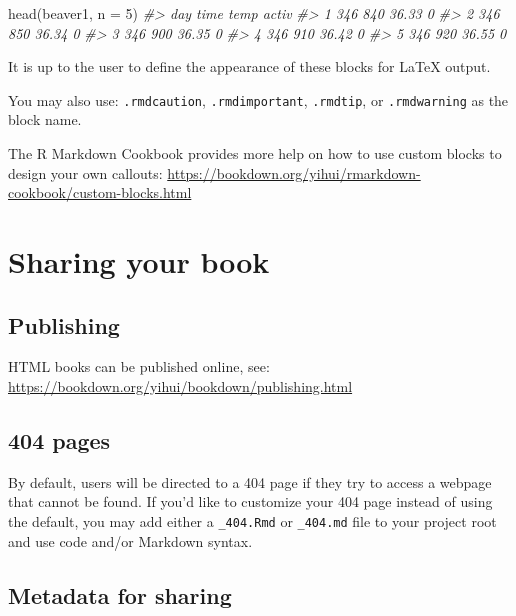 \documentclass[
]{book}
\newenvironment{Shaded}{\begin{snugshade}}{\end{snugshade}}
\newcommand{\AttributeTok}[1]{\textcolor[rgb]{0.77,0.63,0.00}{#1}}
\newcommand{\CommentTok}[1]{\textcolor[rgb]{0.56,0.35,0.01}{\textit{#1}}}
\newcommand{\DecValTok}[1]{\textcolor[rgb]{0.00,0.00,0.81}{#1}}
\newcommand{\FunctionTok}[1]{\textcolor[rgb]{0.00,0.00,0.00}{#1}}
\newcommand{\NormalTok}[1]{#1}
\theoremstyle{definition}
\theoremstyle{definition}
\theoremstyle{definition}
\theoremstyle{definition}
\theoremstyle{remark}
\begin{document}
\begin{Shaded}
\begin{Highlighting}[]
\FunctionTok{head}\NormalTok{(beaver1, }\AttributeTok{n =} \DecValTok{5}\NormalTok{)}
\CommentTok{\#\textgreater{}   day time  temp activ}
\CommentTok{\#\textgreater{} 1 346  840 36.33     0}
\CommentTok{\#\textgreater{} 2 346  850 36.34     0}
\CommentTok{\#\textgreater{} 3 346  900 36.35     0}
\CommentTok{\#\textgreater{} 4 346  910 36.42     0}
\CommentTok{\#\textgreater{} 5 346  920 36.55     0}
\end{Highlighting}
\end{Shaded}

It is up to the user to define the appearance of these blocks for LaTeX output.

You may also use: \texttt{.rmdcaution}, \texttt{.rmdimportant}, \texttt{.rmdtip}, or \texttt{.rmdwarning} as the block name.

The R Markdown Cookbook provides more help on how to use custom blocks to design your own callouts: \url{https://bookdown.org/yihui/rmarkdown-cookbook/custom-blocks.html}

\hypertarget{sharing-your-book}{%
\section{Sharing your book}\label{sharing-your-book}}

\hypertarget{publishing}{%
\subsection{Publishing}\label{publishing}}

HTML books can be published online, see: \url{https://bookdown.org/yihui/bookdown/publishing.html}

\hypertarget{pages}{%
\subsection{404 pages}\label{pages}}

By default, users will be directed to a 404 page if they try to access a webpage that cannot be found. If you'd like to customize your 404 page instead of using the default, you may add either a \texttt{\_404.Rmd} or \texttt{\_404.md} file to your project root and use code and/or Markdown syntax.

\hypertarget{metadata-for-sharing}{%
\subsection{Metadata for sharing}\label{metadata-for-sharing}}
\end{document}
